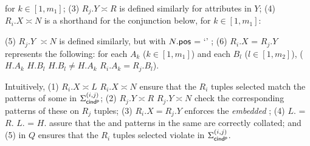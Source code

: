 \noindent
for $k\in[1, m_1]$;
(3) $R_j.Y\asymp R$ is defined similarly for attributes
 in $Y$;
(4) $R_i.X\asymp N$ is a shorthand for the conjunction below,
for $k\in[1, m_1]$:

\begin{footnotesize}
\end{footnotesize}

\noindent
(5) $R_j.Y$ $\asymp N$ is defined similarly,
but with $N.\protect\mathsf{pos}$ = `\RHS' ; (6) $R_i.X$
  = $R_j.Y$ represents the following:
for each $A_k$  ($k\in[1, m_1]$) and each $B_l$ ($l\in[1, m_2]$),
($H.A_k$ 
 $H.B_l$   $H.B_l \ne H.A_k$   $R_i.A_k
= R_j.B_l$).



Intuitively, (1) $R_i.X\asymp L$  $R_i.X\asymp N$ ensure
that the $R_i$ tuples selected match the \LHS patterns of some
\pCINDs in  $\Sigma_{{\mathsf{cind^p}}}^{(i,j)}$;
(2) $R_j.Y\asymp R$  $R_j.Y\asymp N$ check the corresponding
 \RHS patterns of these \pCINDs on
$R_j$ tuples;
(3) $R_i.X = R_j.Y$ enforces the
{\em embedded} \INDs; (4) $L$. = $R$.
 $L$. = $H$. assure that the \LHS and
\RHS patterns in the same \pCIND are correctly collated; and (5)  in $Q$ ensures that the $R_i$ tuples selected violate
\pCINDs in $\Sigma_{{\mathsf{cind^p}}}^{(i,j)}$.



